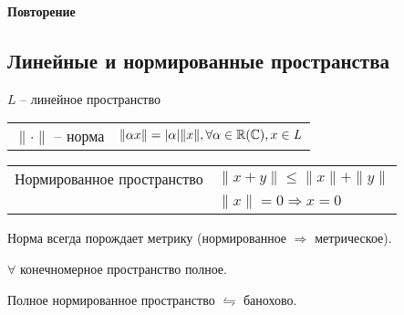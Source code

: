 


    

    {\noindent\Large\textbf{Повторение}} \hfill {}
    \subsection*{Линейные и нормированные пространства}
    
    $\mathit{L}$ -- линейное пространство
    \newline
    \par
    \begin{tabularx}{\textwidth}{X l}
        $\| \cdot \|$ -- норма & $\| \alpha x \| = |\alpha| \| x \|, \forall \alpha \in \mathbb{R} (\mathbb{C}), x \in \mathit L$
    \end{tabularx}
    \newline
    \par
    \begin{tabularx}{\textwidth}{X l}
        Нормированное пространство & $\| x + y \| \le \| x \| + \| y \|$ \\
        & $\| x \| = 0 \Rightarrow x = 0$ \\
    \end{tabularx}

    \begin{remark}
        Норма всегда порождает метрику (нормированное $\Rightarrow$ метрическое).
    \end{remark}

    \begin{remark}
        $\forall$ конечномерное пространство полное.
    \end{remark}

    \begin{definition}
        Полное нормированное пространство $\leftrightharpoons$ банохово.
    \end{definition}

